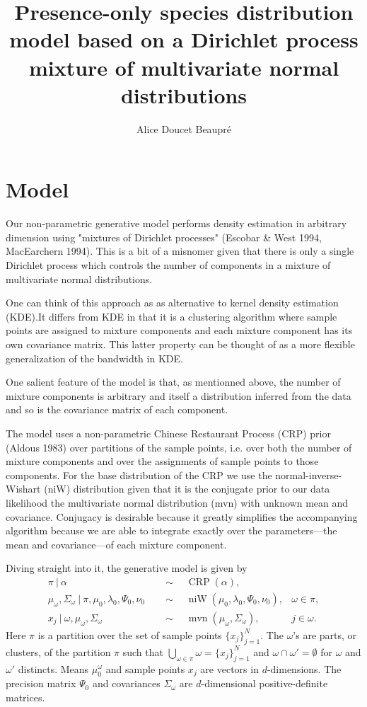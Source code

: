 \documentclass[11pt, oneside]{article}   	%
\title{Presence-only species distribution model based on a Dirichlet process mixture of multivariate normal distributions}
\author{Alice Doucet Beaupr\'e}
\DeclareMathOperator{\niW}{niW}
\DeclareMathOperator{\mvn}{mvn}
\begin{document}
\maketitle
\section{Model}
Our non-parametric generative model performs density estimation in arbitrary dimension using "mixtures of Dirichlet processes" (Escobar \& West 1994, MacEarchern 1994). This is a bit of a misnomer given that there is only a single Dirichlet process which controls the number of components in a mixture of multivariate normal distributions.

One can think of this approach as as alternative to kernel density estimation (KDE).It differs from KDE in that it is a clustering algorithm where sample points are assigned to mixture components and each mixture component has its own covariance matrix. This latter property can be thought of as a more flexible generalization of the bandwidth in KDE.

One salient feature of the model is that, as mentionned above, the number of mixture components is arbitrary and itself a distribution inferred from the data and so is the covariance matrix of each component.

The model uses a non-parametric Chinese Restaurant Process (CRP) prior (Aldous 1983) over partitions of the sample points, i.e. over both the number of mixture components and over the assignments of sample points to those components. For the base distribution of the CRP we use the normal-inverse-Wishart (niW) distribution given that it is the conjugate prior to our data likelihood the multivariate normal distribution (mvn) with unknown mean and covariance. Conjugacy is desirable because it greatly simplifies the accompanying algorithm because we are able to integrate exactly over the parameters—the mean and covariance—of each mixture component.

Diving straight into it, the generative model is given by
\begin{equation}\begin{aligned}
\pi~\vert~\alpha & \quad\sim\quad \operatorname{CRP}(\alpha), \\
\mu_\omega, \Sigma_\omega ~\vert~\pi,\mu_0, \lambda_0, \Psi_0, \nu_0 &\quad\sim\quad \niW(\mu_0, \lambda_0, \Psi_0, \nu_0), &\omega\in\pi,\\
x_j~\vert~\omega, \mu_\omega, \Sigma_\omega & \quad\sim\quad \mvn(\mu_\omega, \Sigma_\omega),& j\in\omega.
\label{eq:model}\end{aligned}\end{equation}
Here $\pi$ is a partition over the set of sample points $\lbrace x_j\rbrace_{j=1}^N$. The $\omega$'s are parts, or clusters, of the partition $\pi$ such that $\bigcup_{\omega\in\pi}\omega = \lbrace x_j\rbrace_{j=1}^N$ and $\omega \cap\omega' = \emptyset$ for $\omega$ and $\omega'$ distincts. Means $\mu_0^\omega$ and sample points $x_j$ are vectors in $d$-dimensions. The precision matrix $\Psi_0$ and covariances $\Sigma_\omega$ are $d$-dimensional positive-definite matrices.
\end{document}
